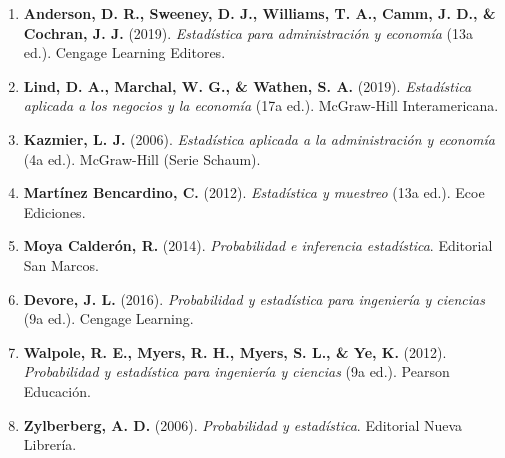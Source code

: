 \documentclass[11pt,twoside,openright]{book}
\begin{document}
\begin{enumerate}
    \item \textbf{Anderson, D. R., Sweeney, D. J., Williams, T. A., Camm, J. D., \& Cochran, J. J.} (2019). \textit{Estadística para administración y economía} (13a ed.). Cengage Learning Editores.
    \item \textbf{Lind, D. A., Marchal, W. G., \& Wathen, S. A.} (2019). \textit{Estadística aplicada a los negocios y la economía} (17a ed.). McGraw-Hill Interamericana.
    \item \textbf{Kazmier, L. J.} (2006). \textit{Estadística aplicada a la administración y economía} (4a ed.). McGraw-Hill (Serie Schaum).
    \item \textbf{Martínez Bencardino, C.} (2012). \textit{Estadística y muestreo} (13a ed.). Ecoe Ediciones.
    \item \textbf{Moya Calderón, R.} (2014). \textit{Probabilidad e inferencia estadística}. Editorial San Marcos.
    \item \textbf{Devore, J. L.} (2016). \textit{Probabilidad y estadística para ingeniería y ciencias} (9a ed.). Cengage Learning.
    \item \textbf{Walpole, R. E., Myers, R. H., Myers, S. L., \& Ye, K.} (2012). \textit{Probabilidad y estadística para ingeniería y ciencias} (9a ed.). Pearson Educación.
    \item \textbf{Zylberberg, A. D.} (2006). \textit{Probabilidad y estadística}. Editorial Nueva Librería.
\end{enumerate}
\end{document}
